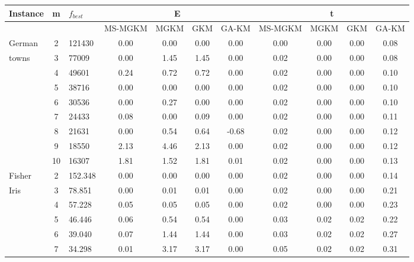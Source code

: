 {\scriptsize
\centering
\begin{longtable}{@{}lclcccccccc@{}}
\toprule
Instance              & m  & $f_{best}$      & \multicolumn{4}{c}{E}           & \multicolumn{4}{c}{t}         \\ \midrule
                      &    &                 & MS-MGKM & MGKM  & GKM   & GA-KM & MS-MGKM & MGKM & GKM  & GA-KM \\
German                & 2  & 121430          & 0.00    & 0.00  & 0.00  & 0.00  & 0.00    & 0.00 & 0.00 & 0.08  \\
towns                 & 3  & 77009           & 0.00    & 1.45  & 1.45  & 0.00  & 0.02    & 0.00 & 0.00 & 0.08  \\
                      & 4  & 49601           & 0.24    & 0.72  & 0.72  & 0.00  & 0.02    & 0.00 & 0.00 & 0.10  \\
                      & 5  & 38716           & 0.00    & 0.00  & 0.00  & 0.00  & 0.02    & 0.00 & 0.00 & 0.10  \\
                      & 6  & 30536           & 0.00    & 0.27  & 0.00  & 0.00  & 0.02    & 0.00 & 0.00 & 0.10  \\
                      & 7  & 24433           & 0.08    & 0.00  & 0.09  & 0.00  & 0.02    & 0.00 & 0.00 & 0.11  \\
                      & 8  & 21631           & 0.00    & 0.54  & 0.64  & -0.68 & 0.02    & 0.00 & 0.00 & 0.12  \\
                      & 9  & 18550           & 2.13    & 4.46  & 2.13  & 0.00  & 0.02    & 0.00 & 0.00 & 0.12  \\
                      & 10 & 16307           & 1.81    & 1.52  & 1.81  & 0.01  & 0.02    & 0.00 & 0.00 & 0.13  \\
Fisher                & 2  & 152.348         & 0.00    & 0.00  & 0.00  & 0.00  & 0.02    & 0.00 & 0.00 & 0.14  \\
Iris                  & 3  & 78.851          & 0.00    & 0.01  & 0.01  & 0.00  & 0.02    & 0.00 & 0.00 & 0.21  \\
                      & 4  & 57.228          & 0.05    & 0.05  & 0.05  & 0.00  & 0.02    & 0.00 & 0.00 & 0.23  \\
                      & 5  & 46.446          & 0.06    & 0.54  & 0.54  & 0.00  & 0.03    & 0.02 & 0.02 & 0.22  \\
                      & 6  & 39.040          & 0.07    & 1.44  & 1.44  & 0.00  & 0.03    & 0.02 & 0.02 & 0.27  \\
                      & 7  & 34.298          & 0.01    & 3.17  & 3.17  & 0.00  & 0.05    & 0.02 & 0.02 & 0.31  \\

\end{longtable}}
